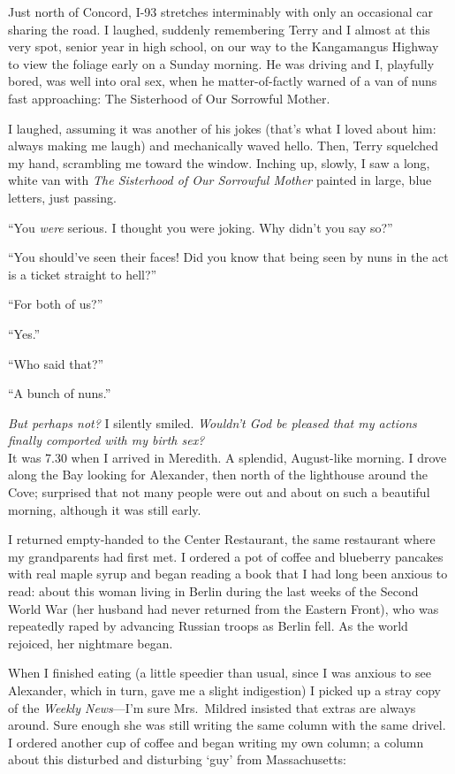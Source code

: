 Just north of Concord, I-93 stretches interminably with only an
occasional car sharing the road. I laughed, suddenly remembering Terry
and I almost at this very spot, senior year in high school, on our way
to the Kangamangus Highway to view the foliage early on a Sunday
morning. He was driving and I, playfully bored, was well into oral sex,
when he matter-of-factly warned of a van of nuns fast approaching: The
Sisterhood of Our Sorrowful Mother.

I laughed, assuming it was another of his jokes (that's what I loved
about him: always making me laugh) and mechanically waved hello. Then,
Terry squelched my hand, scrambling me toward the window. Inching up,
slowly, I saw a long, white van with \emph{The Sisterhood of Our
Sorrowful Mother} painted in large, blue letters, just passing.

``You \emph{were} serious. I thought you were joking. Why didn't you say
so?''

``You should've seen their faces! Did you know that being seen by nuns
in the act is a ticket straight to hell?''

``For both of us?''

``Yes.''

``Who said that?''

``A bunch of nuns.''

\emph{But perhaps not?} I silently smiled. \emph{Wouldn't God be pleased
that my actions finally comported with my birth sex?}\\

It was 7.30 when I arrived in Meredith. A splendid, August-like morning.
I drove along the Bay looking for Alexander, then north of the
lighthouse around the Cove; surprised that not many people were out and
about on such a beautiful morning, although it was still early.

I returned empty-handed to the Center Restaurant, the same restaurant
where my grandparents had first met. I ordered a pot of coffee and
blueberry pancakes with real maple syrup and began reading a book that I
had long been anxious to read: about this woman living in Berlin during
the last weeks of the Second World War (her husband had never returned
from the Eastern Front), who was repeatedly raped by advancing Russian
troops as Berlin fell. As the world rejoiced, her nightmare began.

When I finished eating (a little speedier than usual, since I was
anxious to see Alexander, which in turn, gave me a slight indigestion) I
picked up a stray copy of the \emph{Weekly News}---I'm sure Mrs.~Mildred
insisted that extras are always around. Sure enough she was still
writing the same column with the same drivel. I ordered another cup of
coffee and began writing my own column; a column about this disturbed
and disturbing `guy' from Massachusetts:

